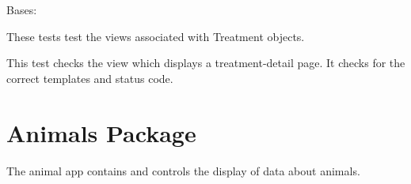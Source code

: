 \documentclass[letterpaper,10pt,english]{sphinxmanual}
\begin{document}
\begin{fulllineitems}
\label{api:mousedb.data.tests.TreatmentViewTests}
Bases: 

These tests test the views associated with Treatment objects.

\begin{fulllineitems}
\label{api:mousedb.data.tests.TreatmentViewTests.fixtures}
\end{fulllineitems}


\begin{fulllineitems}
\label{api:mousedb.data.tests.TreatmentViewTests.setUp}
\end{fulllineitems}


\begin{fulllineitems}
\label{api:mousedb.data.tests.TreatmentViewTests.tearDown}
\end{fulllineitems}


\begin{fulllineitems}
\label{api:mousedb.data.tests.TreatmentViewTests.test_treatment_detail}
This test checks the view which displays a treatment-detail page.  It checks for the correct templates and status code.

\end{fulllineitems}


\end{fulllineitems}



\section{Animals Package}
\label{api:animals-package}\label{api:module-mousedb.animal}
The animal app contains and controls the display of data about animals.
\end{document}
